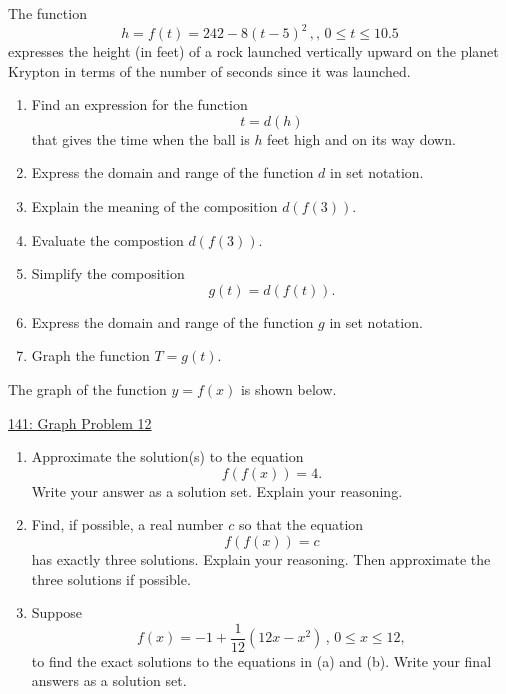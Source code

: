 \documentclass{ximera}
\begin{document}
\begin{question} \label{Q34gfgryt55yt5t}
The function
\[
    h = f(t) = 242 - 8 (t-5)^2 \, , ,\, 0\leq t \leq 10.5
\]
expresses the height (in feet) of a rock launched vertically upward on the planet Krypton in terms of the number of seconds since it was launched.

\begin{enumerate}
\item Find an expression for the function
\[
 t = d(h)
\]
that gives the time when the ball is $h$ feet high and on its way down.

\item Express the domain and range of the function $d$ in set notation.

\item Explain the meaning of the composition $d(f(3))$.

\item Evaluate the compostion $d(f(3))$.

\item Simplify the composition
\[
    g(t) = d(f(t)).
\]

\item Express the domain and range of the function $g$ in set notation.

\item Graph the function $T=g(t)$.


\end{enumerate}
\end{question}

\begin{question} \label{Q5gbrghbnnmvcvhn}
The graph of the function $y=f(x)$ is shown below.


\begin{onlineOnly}
    \begin{center}
\end{center}
\end{onlineOnly}


\href{https://www.desmos.com/calculator/got9sylex8}{141: Graph Problem 12}


\begin{enumerate}
\item Approximate the solution(s) to the equation 
\[
 f(f(x)) = 4.
\]
Write your answer as a solution set. Explain your reasoning.

\item Find, if possible, a real number $c$ so that the equation
\[
   f(f(x))=c
\]
has exactly three solutions. Explain your reasoning. Then approximate the three solutions if possible.

\item Suppose
\[
  f(x) = -1 + \frac{1}{12}(12x-x^2) \, , \, 0\leq x \leq 12 ,
\]
to find the exact solutions to the equations in (a) and (b). Write your final answers as a solution set.
\end{enumerate}

\end{question}
\end{document}
